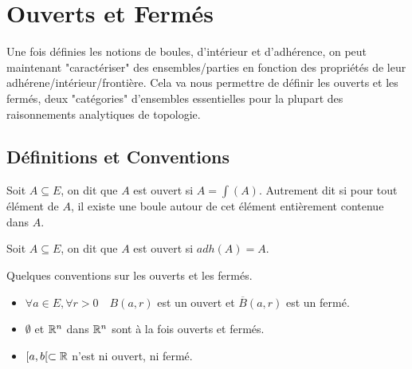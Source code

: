 
\minitoc



\section{Ouverts et Fermés}

Une fois définies les notions de boules, d'intérieur et d'adhérence, on peut maintenant "caractériser" 
des ensembles/parties en fonction des propriétés de leur adhérene/intérieur/frontière. 
Cela va nous permettre de définir les ouverts et les fermés, deux "catégories" d'ensembles essentielles pour 
la plupart des raisonnements analytiques de topologie. 

\subsection{Définitions et Conventions}

\begin{definition}
    Soit $A \subseteq E$, on dit que $A$ est ouvert si $A = \int(A)$. 
    Autrement dit si pour tout élément de $A$, il existe une boule autour de cet élément entièrement 
    contenue dans $A$. 
\end{definition}

\begin{definition}
    Soit $A \subseteq E$, on dit que $A$ est ouvert si $adh(A) = A$. 
\end{definition}

\begin{remark}
    Quelques conventions sur les ouverts et les fermés. 
    \begin{itemize}
        \item $ \forall a \in E, \forall r > 0 \quad B(a,r)$ est un ouvert et $\overline{B}(a,r)$ est un fermé. 
        \item $\emptyset$ et $\mathbb{R}^n$ dans $\mathbb{R}^n$ sont à la fois ouverts et fermés. 
        \item $[a,b[ \subset \mathbb{R}$ n'est ni ouvert, ni fermé.  
    \end{itemize}
\end{remark}

